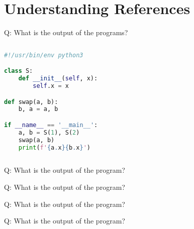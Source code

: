 \begin{frame}
    \centering
    \scalebox{5}{PART I}
\end{frame}

\begin{frame}
    \centering
    \scalebox{3}{Understanding References}
\end{frame}

\section{Understanding References}

\begin{frame}[fragile]{Q: What is the output of the programs?}
    \begin{columns}[t]
        \begin{column}{.45\textwidth}

    \begin{lstlisting}[language=python]
#!/usr/bin/env python3

class S:
    def __init__(self, x):
        self.x = x

def swap(a, b):
    b, a = a, b

if __name__ == '__main__':
    a, b = S(1), S(2)
    swap(a, b)
    print(f'{a.x}{b.x}')
    \end{lstlisting}
        \end{column}
        \begin{column}{.45\textwidth}

        \end{column}
    \end{columns}
\end{frame}

\begin{frame}[fragile]{Q: What is the output of the program?}
\end{frame}


\begin{frame}[fragile]{Q: What is the output of the program?}
\end{frame}


\begin{frame}[fragile]{Q: What is the output of the program?}
\end{frame}


\begin{frame}[fragile]{Q: What is the output of the program?}
\end{frame}


